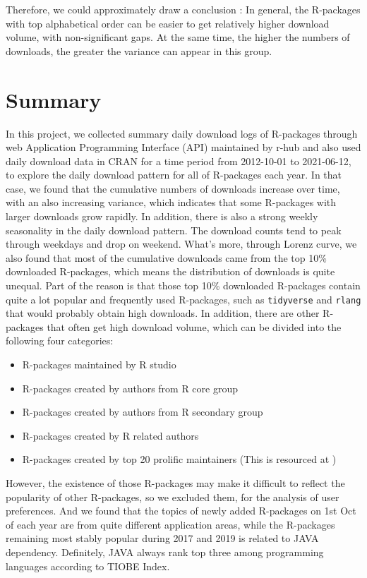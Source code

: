 \documentclass[
]{book}
\providecommand{\tightlist}{%
  \setlength{\itemsep}{0pt}\setlength{\parskip}{0pt}}
\begin{document}
Therefore, we could approximately draw a conclusion : In general, the R-packages with top alphabetical order can be easier to get relatively higher download volume, with non-significant gaps. At the same time, the higher the numbers of downloads, the greater the variance can appear in this group.

\hypertarget{summary}{%
\chapter{Summary}\label{summary}}

In this project, we collected summary daily download logs of R-packages through web Application Programming Interface (API) maintained by r-hub\citep{rhub} and also used daily download data in CRAN for a time period from 2012-10-01 to 2021-06-12, to explore the daily download pattern for all of R-packages each year. In that case, we found that the cumulative numbers of downloads increase over time, with an also increasing variance, which indicates that some R-packages with larger downloads grow rapidly. In addition, there is also a strong weekly seasonality in the daily download pattern. The download counts tend to peak through weekdays and drop on weekend. What's more, through Lorenz curve, we also found that most of the cumulative downloads came from the top 10\% downloaded R-packages, which means the distribution of downloads is quite unequal. Part of the reason is that those top 10\% downloaded R-packages contain quite a lot popular and frequently used R-packages, such as \texttt{tidyverse} and \texttt{rlang} that would probably obtain high downloads. In addition, there are other R-packages that often get high download volume, which can be divided into the following four categories:

\begin{itemize}
\tightlist
\item
  R-packages maintained by R studio
\item
  R-packages created by authors from R core group
\item
  R-packages created by authors from R secondary group
\item
  R-packages created by R related authors
\item
  R-packages created by top 20 prolific maintainers (This is resourced at \citet{revolutions})
\end{itemize}

However, the existence of those R-packages may make it difficult to reflect the popularity of other R-packages, so we excluded them, for the analysis of user preferences. And we found that the topics of newly added R-packages on 1st Oct of each year are from quite different application areas, while the R-packages remaining most stably popular during 2017 and 2019 is related to JAVA dependency. Definitely, JAVA always rank top three among programming languages according to TIOBE Index\citep{tiobe}.
\end{document}
